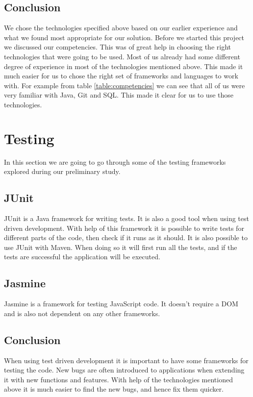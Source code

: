 \subsection{Conclusion}

We chose the technologies specified above based on our earlier experience and what we found most appropriate for our solution.
Before we started this project we discussed our competencies.
This was of great help in choosing the right technologies that were going to be used.
Most of us already had some different degree of experience in most of the technologies mentioned above.
This made it much easier for us to chose the right set of frameworks and languages to work with.
For example from table \ref{table:competencies} we can see that all of us were very familiar with Java, Git and SQL.
This made it clear for us to use those technologies.

\section{Testing}
\label{section:testing}

In this section we are going to go through some of the testing frameworks explored during our preliminary study.

\subsection{JUnit}

JUnit is a Java framework for writing tests. It is also a good tool when using test driven development.
With help of this framework it is possible to write tests for different parts of the code, then check if it runs as it should.
It is also possible to use JUnit with Maven.
When doing so it will first run all the tests, and if the tests are successful the application will be executed. \cite{JUnit}

\subsection{Jasmine}

Jasmine is a framework for testing JavaScript code.	
It doesn't require a DOM and is also not dependent on any other frameworks. \cite{Jasmine}

\subsection{Conclusion}

When using test driven development it is important to have some frameworks for testing the code.
New bugs are often introduced to applications when extending it with new functions and features.
With help of the technologies mentioned above it is much easier to find the new bugs, and hence fix them quicker.